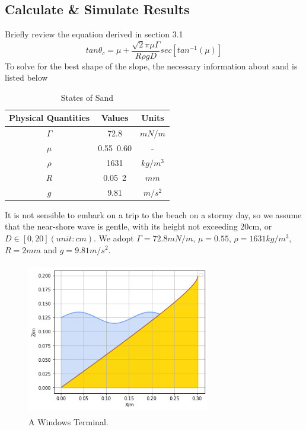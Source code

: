 \documentclass[12pt]{article}
\begin{document}
\subsection{Calculate \& Simulate Results}
Briefly review the equation derived in section 3.1
$$tan\theta_c = \mu + \frac{\sqrt{2}\pi\mu\Gamma}{R\rho gD}sec[tan^{-1}(\mu)]$$
To solve for the best shape of the slope, the necessary information about sand is listed below
\begin{table}[H]
    \caption{States of Sand}
    \vspace{10pt}
    \centering
    \begin{tabular}{ccc} 
        \hline
        Physical Quantities & Values    & Units    \\
        \hline
        $\Gamma$            & 72.8      & $mN/m$   \\
        $\mu$               & 0.55~0.60 & -        \\
        $\rho$              & 1631      & $kg/m^3$ \\
        $R$                 & 0.05~2    & $mm$     \\
        $g$                 & 9.81      & $m/s^2$  \\
        \hline
    \end{tabular}
    \label{bs2}
\end{table}
\par
It is not sensible to embark on a trip to the beach on a stormy day, so we assume that the near-shore wave is gentle, with its height not exceeding 20cm, or $D \in [0, 20](unit:cm)$.
We adopt $\Gamma = 72.8mN/m$, $\mu = 0.55$, $\rho = 1631kg/m^3$, $R = 2mm$ and $g = 9.81m/s^2$. 
\begin{figure}[H]
	\centering
	\includegraphics[width=8cm, height = 6.67cm]{sand5.png}
	\caption{A Windows Terminal.}
	\label{the shape of the slope}
\end{figure}
\end{document}
